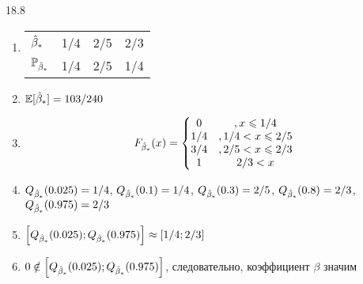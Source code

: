 \protect \hypertarget {soln:18.8}{}
\begin{solution}{{18.8}}
\begin{enumerate}
\item

\begin{tabular}{llll}
\toprule
$\hat{\beta}_*$ & 1/4 & 2/5 & 2/3 \\
$\mathbb{P}_{\hat{\beta}_*}$ & 1/4   & 2/5   & 1/4 \\
\bottomrule
\end{tabular}

\item $\mathbb{E} [\hat{\beta}_*] = 103/240$
\item
\[
F_{\hat{\beta}_*}(x) =
\left\{\begin{matrix}
0 & , x \leqslant 1/4 \\
1/4 & ,1/4 < x \leqslant 2/5 \\
3/4 & , 2/5 < x \leqslant 2/3\\
1 & 2/3 < x
\end{matrix}\right.
\]
\item $Q_{\hat{\beta}_*} (0.025) = 1/4$, $Q_{\hat{\beta}_*} (0.1) = 1/4$, $Q_{\hat{\beta}_*} (0.3) = 2/5$, $Q_{\hat{\beta}_*} (0.8) = 2/3$, $Q_{\hat{\beta}_*} (0.975) = 2/3$
\item $\left[ Q_{\hat{\beta}_*} (0.025);  Q_{\hat{\beta}_*} (0.975) \right] \approx \left[1/4; 2/3 \right] $
\item $0 \notin  \left[ Q_{\hat{\beta}_*} (0.025);  Q_{\hat{\beta}_*} (0.975) \right]$, следовательно, коэффициент $\beta$ значим
\end{enumerate}
\end{solution}
\protect \hypertarget {soln:18.9}{}
